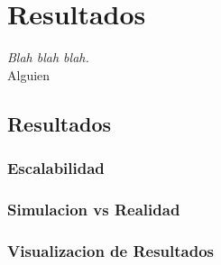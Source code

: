
\chapter*{Resultados} \label{cap6}


\begin{flushright}
\begin{minipage}{7.85cm}
    {\em Blah blah blah.} \\  Alguien
\end{minipage}
\end{flushright}

\vspace*{5mm}

\section*{Resultados}
\subsection*{Escalabilidad}
\subsection*{Simulacion vs Realidad}
\subsection*{Visualizacion de Resultados}
